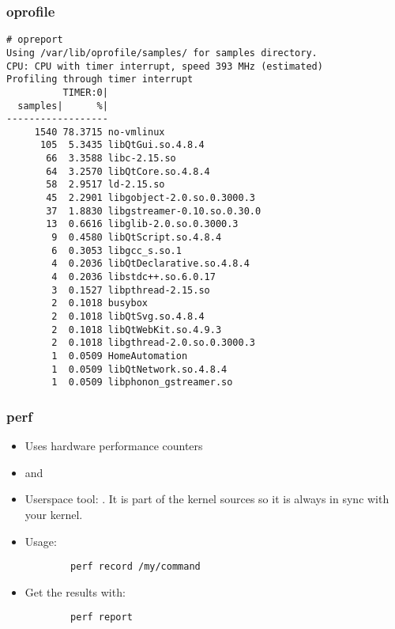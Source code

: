 \begin{frame}[fragile]
\frametitle{oprofile}
\begin{block}{}
\tiny
\begin{verbatim}
# opreport
Using /var/lib/oprofile/samples/ for samples directory.
CPU: CPU with timer interrupt, speed 393 MHz (estimated)
Profiling through timer interrupt
          TIMER:0|
  samples|      %|
------------------
     1540 78.3715 no-vmlinux
      105  5.3435 libQtGui.so.4.8.4
       66  3.3588 libc-2.15.so
       64  3.2570 libQtCore.so.4.8.4
       58  2.9517 ld-2.15.so
       45  2.2901 libgobject-2.0.so.0.3000.3
       37  1.8830 libgstreamer-0.10.so.0.30.0
       13  0.6616 libglib-2.0.so.0.3000.3
        9  0.4580 libQtScript.so.4.8.4
        6  0.3053 libgcc_s.so.1
        4  0.2036 libQtDeclarative.so.4.8.4
        4  0.2036 libstdc++.so.6.0.17
        3  0.1527 libpthread-2.15.so
        2  0.1018 busybox
        2  0.1018 libQtSvg.so.4.8.4
        2  0.1018 libQtWebKit.so.4.9.3
        2  0.1018 libgthread-2.0.so.0.3000.3
        1  0.0509 HomeAutomation
        1  0.0509 libQtNetwork.so.4.8.4
        1  0.0509 libphonon_gstreamer.so
\end{verbatim}
\end{block}
\end{frame}

\begin{frame}[fragile]
\frametitle{perf}
\begin{itemize}
	\item Uses hardware performance counters
	\item {} and 
	\item Userspace tool: . It is part of the kernel
		sources so it is always in sync with your kernel.
	\item Usage:
	\begin{block}{}
	\begin{verbatim}
		perf record /my/command
	\end{verbatim}
	\end{block}
	\item Get the results with:
	\begin{block}{}
	\begin{verbatim}
		perf report
	\end{verbatim}
	\end{block}
\end{itemize}
\end{frame}

